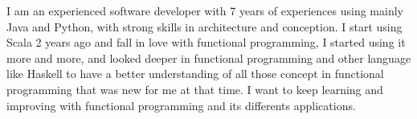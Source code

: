 

\begin{cvparagraph}

I am an experienced software developer with 7 years of experiences using mainly Java and Python, with strong skills in architecture and conception.
I start using Scala 2 years ago and fall in love with functional programming, I started using it more and more, and looked deeper in functional programming and other language like Haskell to have a better understanding of all those concept in functional programming that was new for me at that time.
I want to keep learning and improving with functional programming and its differents applications.

\end{cvparagraph}
